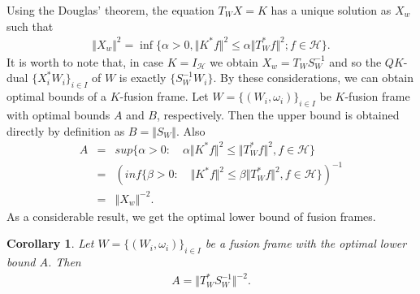 \documentclass{birkjour}
\newtheorem{cor}[thm]{Corollary}
\theoremstyle{definition}
\theoremstyle{remark}
\numberwithin{equation}{section}
\begin{document}
Using the Douglas' theorem, the equation $T_{W}X=K$ has a unique solution as $X_{w}$ such that 
\begin{eqnarray}\label{XW}
\Vert X_{w}\Vert ^{2} = \inf \{\alpha>0, \Vert K^{*}f\Vert ^{2}\leq \alpha\Vert T_{W}^{*}f\Vert ^{2}; f\in \mathcal{H}\}.
\end{eqnarray} 
It is worth to note that, in case  $K=I_{\mathcal{H}}$ we obtain $X_{w}=T_{W}S_{W}^{-1}$ and so the $QK$-dual $\{X_{i}^{*}W_{i}\}_{i\in I}$ of $W$ is exactly $\{S_{W}^{-1}W_{i}\}$. By these considerations, we can obtain optimal bounds of a $K$-fusion frame.
Let   $W = \lbrace (W_{i}, \omega_{i})\rbrace_{i\in I}$ be $K$-fusion frame with optimal bounds $A$ and $B$, respectively. Then the upper bound is obtained directly by definition as $B=\Vert S_{W}\Vert$.  Also
\begin{eqnarray*}
A &=& sup\{\alpha>0: \quad \alpha \Vert K^{*}f\Vert^{2}\leq \Vert T_{W}^{*}f\Vert^{2}, f\in \mathcal{H}\}\\
&=&\left(inf\{\beta>0: \quad  \Vert K^{*}f\Vert^{2}\leq \beta\Vert T_{W}^{*}f\Vert^{2}, f\in \mathcal{H}\}\right)^{-1}\\
&=& \Vert X_{w}\Vert^{-2}.
\end{eqnarray*} 
As a considerable result, we get the optimal lower bound of  fusion frames.
\begin{cor}
Let   $W = \lbrace (W_{i}, \omega_{i})\rbrace_{i\in I}$ be a fusion frame with the optimal lower bound $A$. Then 
\begin{eqnarray*}
A = \Vert T_{W}^{*}S_{W}^{-1}\Vert^{-2}.
\end{eqnarray*} 
\end{cor}
\end{document}
